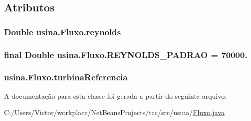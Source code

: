\subsection{Atributos}
\hypertarget{classusina_1_1_fluxo_a185fed046eefce4fa8f8bb10fde8296d}{
\subsubsection[{reynolds}]{\setlength{\rightskip}{0pt plus 5cm}Double usina.\-Fluxo.\-reynolds\hspace{0.3cm}{\ttfamily [private]}}}\label{classusina_1_1_fluxo_a185fed046eefce4fa8f8bb10fde8296d}
\hypertarget{classusina_1_1_fluxo_ad85aeeb220a6c87764d29ce36bb8cc26}{
\subsubsection[{R\-E\-Y\-N\-O\-L\-D\-S\-\_\-\-P\-A\-D\-R\-A\-O}]{\setlength{\rightskip}{0pt plus 5cm}final Double usina.\-Fluxo.\-R\-E\-Y\-N\-O\-L\-D\-S\-\_\-\-P\-A\-D\-R\-A\-O = 70000.\hspace{0.3cm}{\ttfamily [static]}}}\label{classusina_1_1_fluxo_ad85aeeb220a6c87764d29ce36bb8cc26}
\hypertarget{classusina_1_1_fluxo_aee04932f02b1bfad1bf79cc80a1df203}{
\subsubsection[{turbina\-Referencia}]{ usina.\-Fluxo.\-turbina\-Referencia\hspace{0.3cm}{\ttfamily [private]}}}\label{classusina_1_1_fluxo_aee04932f02b1bfad1bf79cc80a1df203}


A documentação para esta classe foi gerada a partir do seguinte arquivo\-:\begin{DoxyCompactItemize}
\item 
C\-:/\-Users/\-Victor/workplace/\-Net\-Beans\-Projects/tcc/src/usina/\hyperlink{_fluxo_8java}{Fluxo.\-java}\end{DoxyCompactItemize}
